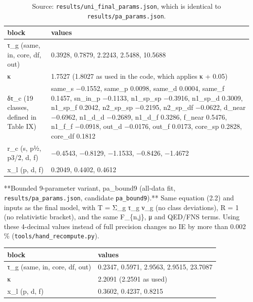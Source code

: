\documentclass[aps,pra,preprint,superscriptaddress,amsmath,amssymb]{revtex4-2}
\begin{document}
\begin{table}[htbp]
\caption{Source: \texttt{results/uni\_final\_params.json}, which is identical to \texttt{results/pa\_params.json}.}
\footnotesize
\begin{ruledtabular}
\begin{tabular}{ll}
block & values \\
\hline
τ\_g (same, in, core, df, out) & 0.3928, 0.7879, 2.2243, 2.5488, 10.5688 \\
κ & 1.7527 (1.8027 as used in the code, which applies \textbar{}κ\textbar{} + 0.05) \\
δτ\_c (19 classes, defined in Table IX) & same\_s −0.1552, same\_p 0.0098, same\_d 0.0004, same\_f 0.1457, sn\_in\_p −0.1133, n1\_sp\_sp −0.3916, n1\_sp\_d 0.3009, n1\_sp\_f 0.2042, n2\_sp\_sp −0.2195, n2\_sp\_df −0.0622, d\_near −0.6962, n1\_d\_d −0.2689, n1\_d\_f 0.3286, f\_near 0.5476, n1\_f\_f −0.0918, out\_d −0.0176, out\_f 0.0173, core\_sp 0.2828, core\_df 0.1812 \\
r\_c (s, p½, p3/2, d, f) & −0.4543, −0.8129, −1.1533, −0.8426, −1.4672 \\
x\_l (p, d, f) & 0.2049, 0.4402, 0.4612 \\
\end{tabular}
\end{ruledtabular}
\end{table}


**Bounded 9-parameter variant, pa\_bound9 (all-data fit, \texttt{results/pa\_params.json}, candidate \texttt{pa\_bound9}).** Same equation (2.2) and inputs as the final model, with T = Σ\_g τ\_g ν\_g (no class deviations), R = 1 (no relativistic bracket), and the same F\_\{n,j\}, μ and QED/FNS terms. Using these 4-decimal values instead of full precision changes no IE by more than 0.002 \% (\texttt{tools/hand\_recompute.py}).


\begin{table}[h]
\footnotesize
\begin{ruledtabular}
\begin{tabular}{ll}
block & values \\
\hline
τ\_g (same, in, core, df, out) & 0.2347, 0.5971, 2.9563, 2.9515, 23.7087 \\
κ & 2.2091 (2.2591 as used) \\
x\_l (p, d, f) & 0.3602, 0.4237, 0.8215 \\
\end{tabular}
\end{ruledtabular}
\end{table}
\end{document}
